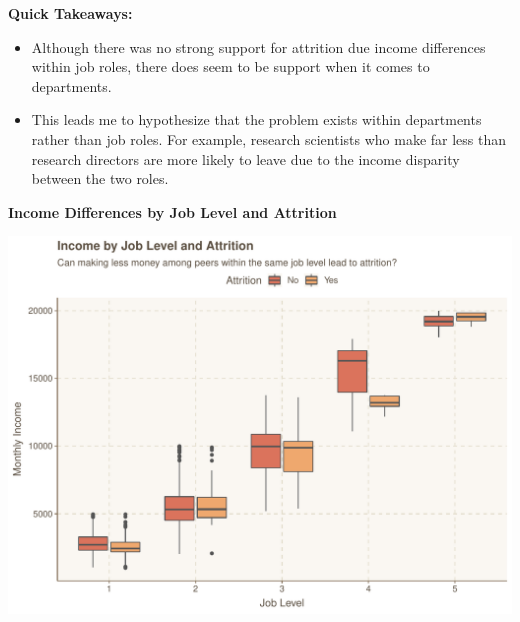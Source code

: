 \documentclass[
]{article}
\newenvironment{Shaded}{\begin{snugshade}}{\end{snugshade}}
\newcommand{\DataTypeTok}[1]{\textcolor[rgb]{0.13,0.29,0.53}{#1}}
\newcommand{\KeywordTok}[1]{\textcolor[rgb]{0.13,0.29,0.53}{\textbf{#1}}}
\newcommand{\NormalTok}[1]{#1}
\newcommand{\OperatorTok}[1]{\textcolor[rgb]{0.81,0.36,0.00}{\textbf{#1}}}
\newcommand{\StringTok}[1]{\textcolor[rgb]{0.31,0.60,0.02}{#1}}
\providecommand{\tightlist}{%
  \setlength{\itemsep}{0pt}\setlength{\parskip}{0pt}}
\begin{document}
\textbf{Quick Takeaways:}

\begin{itemize}
\tightlist
\item
  Although there was no strong support for attrition due income
  differences within job roles, there does seem to be support when it
  comes to departments.
\item
  This leads me to hypothesize that the problem exists within
  departments rather than job roles. For example, research scientists
  who make far less than research directors are more likely to leave due
  to the income disparity between the two roles.
\end{itemize}

\textbf{Income Differences by Job Level and Attrition}

\begin{Shaded}
\end{Shaded}

\includegraphics{figures/Income Differences by Job Level and Attrition-1.pdf}
\end{document}
